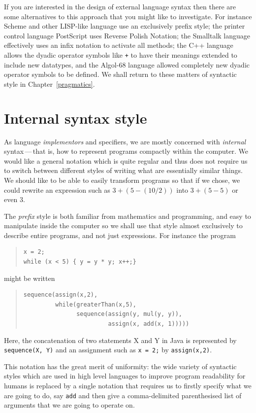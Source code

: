 If you are interested in the design of external language syntax then there are some alternatives to this approach that you might like to investigate. For instance Scheme and other LISP-like language use an exclusively prefix style; the printer control language PostScript uses Reverse Polish Notation; the Smalltalk language effectively uses an infix notation to activate all methods; the C++ language allows the dyadic operator symbols like \verb-+- to have their meanings extended to include new datatypes, and the Algol-68 language allowed completely new dyadic operator symbols to be defined. We shall return to these matters of syntactic style in Chapter~\ref{pragmatics}.
\section{Internal syntax style}
As language {\em implementors} and specifiers, we are mostly concerned with {\em internal} syntax\,---\,that is, how to represent programs compactly within the computer. We would like a general notation which is quite regular and thus does not require us to switch between different styles of writing what are essentially similar things. We should like to be able to easily transform programs so that if we chose, we could rewrite an expression such as $3+(5-(10/2))$ into $3+(5-5)$ or even $3$.

The {\em prefix} style is both familiar from mathematics and programming, and easy to manipulate inside the computer so we shall use that style almost exclusively to describe entire programs, and not just expressions. For instance the program
\begin{quote}
\begin{verbatim}
x = 2;
while (x < 5) { y = y * y; x++;}
\end{verbatim}
\end{quote}
might be written
\begin{quote}
\begin{verbatim}
sequence(assign(x,2), 
         while(greaterThan(x,5), 
               sequence(assign(y, mul(y, y)),
                        assign(x, add(x, 1)))))
\end{verbatim}
\end{quote}
Here, the concatenation of two statements X and Y in Java is represented by \verb+sequence(X, Y)+ and an assignment such as \verb+x = 2;+ by \verb+assign(x,2)+.

This notation has the great merit of uniformity: the wide variety of syntactic styles which are used in high level languages to improve program readability for humans is replaced by a single notation that requires us to firstly specify what we are going to do, say \verb+add+ and then give a comma-delimited parenthesised list of arguments that we are going to operate on.

